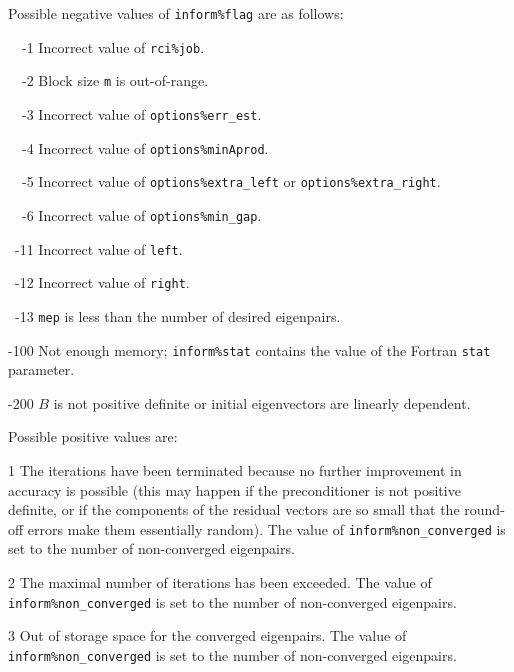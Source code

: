 Possible negative values of {\tt inform\%flag}
are as follows:
%
\begin{description}
%
\item{~~-1}
\hskip 9pt
Incorrect value of {\tt rci\%job}.
%
\item{~~-2}
\hskip 9pt
Block size {\tt m} is out-of-range.
%
\item{~~-3}
\hskip 9pt
Incorrect value of 
{\tt options\%err\_est}. %
%
\item{~~-4}
\hskip 9pt
Incorrect value of {\tt options\%minAprod}.
%
\item{~~-5}
\hskip 9pt
Incorrect value of 
{\tt options\%extra\_left} or
{\tt options\%extra\_right}.
%
\item{~~-6}
\hskip 9pt
Incorrect value of 
{\tt options\%min\_gap}. %
%
\item{~-11}
\hskip 7pt
Incorrect value of 
{\tt left}. %
%
\item{~-12}
\hskip 7pt
Incorrect value of 
{\tt right}. %
%
\item{~-13}
\hskip 7pt
{\tt mep} is less than 
the number of desired eigenpairs.
%
\item{-100}
\hskip 4pt
Not enough memory;
{\tt inform\%stat} contains the value of the Fortran {\tt stat} parameter.
%
\item{-200}
\hskip 4pt
$B$ is not positive definite or initial eigenvectors are linearly dependent.
%
\end{description}

Possible positive values  are: 
%
\begin{description}
\item{1}
\hskip 9pt
The iterations have been terminated because no further improvement
in accuracy is possible (this may happen if the preconditioner is
not positive definite, or if the components of the residual vectors
are so small that the round-off
errors make them essentially random).
The value of {\tt inform\%non\_converged} is set to the number
of non-converged eigenpairs.
\item{2}
\hskip 9pt
The maximal number of iterations has been exceeded.
The value of {\tt inform\%non\_converged} is set to the number
of non-converged eigenpairs.
\item{3}
\hskip 9pt
Out of storage space for the converged eigenpairs.
The value of {\tt inform\%non\_converged} is set to the number
of non-converged eigenpairs.
%
\end{description}

